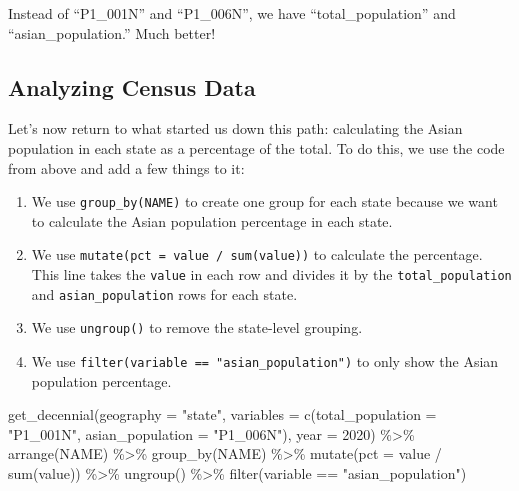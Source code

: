 \documentclass[
]{book}
\newenvironment{Shaded}{\begin{snugshade}}{\end{snugshade}}
\newcommand{\AttributeTok}[1]{\textcolor[rgb]{0.77,0.63,0.00}{#1}}
\newcommand{\DecValTok}[1]{\textcolor[rgb]{0.00,0.00,0.81}{#1}}
\newcommand{\FunctionTok}[1]{\textcolor[rgb]{0.00,0.00,0.00}{#1}}
\newcommand{\NormalTok}[1]{#1}
\newcommand{\SpecialCharTok}[1]{\textcolor[rgb]{0.00,0.00,0.00}{#1}}
\newcommand{\StringTok}[1]{\textcolor[rgb]{0.31,0.60,0.02}{#1}}
\providecommand{\tightlist}{%
  \setlength{\itemsep}{0pt}\setlength{\parskip}{0pt}}
\begin{document}
Instead of ``P1\_001N'' and ``P1\_006N'', we have ``total\_population'' and ``asian\_population.'' Much better!

\hypertarget{analyzing-census-data}{%
\subsection*{Analyzing Census Data}\label{analyzing-census-data}}

Let's now return to what started us down this path: calculating the Asian population in each state as a percentage of the total. To do this, we use the code from above and add a few things to it:

\begin{enumerate}
\def\labelenumi{\arabic{enumi}.}
\tightlist
\item
  We use \texttt{group\_by(NAME)} to create one group for each state because we want to calculate the Asian population percentage in each state.
\item
  We use \texttt{mutate(pct\ =\ value\ /\ sum(value))} to calculate the percentage. This line takes the \texttt{value} in each row and divides it by the \texttt{total\_population} and \texttt{asian\_population} rows for each state.
\item
  We use \texttt{ungroup()} to remove the state-level grouping.
\item
  We use \texttt{filter(variable\ ==\ "asian\_population")} to only show the Asian population percentage.
\end{enumerate}

\begin{Shaded}
\begin{Highlighting}[]
\FunctionTok{get\_decennial}\NormalTok{(}\AttributeTok{geography =} \StringTok{"state"}\NormalTok{, }
              \AttributeTok{variables =} \FunctionTok{c}\NormalTok{(}\AttributeTok{total\_population =} \StringTok{"P1\_001N"}\NormalTok{, }
                            \AttributeTok{asian\_population =} \StringTok{"P1\_006N"}\NormalTok{),}
              \AttributeTok{year =} \DecValTok{2020}\NormalTok{) }\SpecialCharTok{\%\textgreater{}\%} 
  \FunctionTok{arrange}\NormalTok{(NAME) }\SpecialCharTok{\%\textgreater{}\%} 
  \FunctionTok{group\_by}\NormalTok{(NAME) }\SpecialCharTok{\%\textgreater{}\%} 
  \FunctionTok{mutate}\NormalTok{(}\AttributeTok{pct =}\NormalTok{ value }\SpecialCharTok{/} \FunctionTok{sum}\NormalTok{(value)) }\SpecialCharTok{\%\textgreater{}\%} 
  \FunctionTok{ungroup}\NormalTok{() }\SpecialCharTok{\%\textgreater{}\%} 
  \FunctionTok{filter}\NormalTok{(variable }\SpecialCharTok{==} \StringTok{"asian\_population"}\NormalTok{)}
\end{Highlighting}
\end{Shaded}
\end{document}
